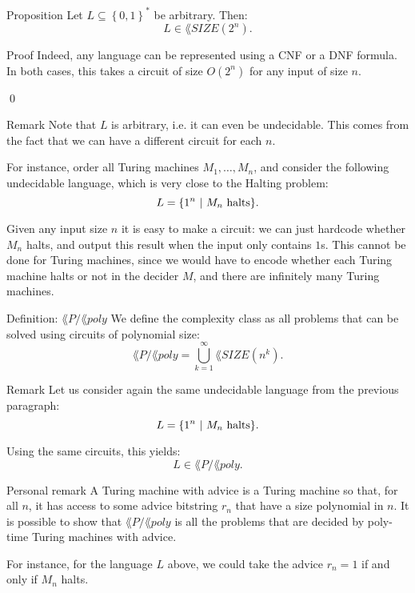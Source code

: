 \documentclass[a4paper]{article}
\begin{document}
\begin{parag}{Proposition}
    Let $L \subseteq \left\{0, 1\right\}^*$ be arbitrary. Then: 
    \[L \in \lang{SIZE}\left(2^n\right).\]

    \begin{subparag}{Proof}
        Indeed, any language can be represented using a CNF or a DNF formula. In both cases, this takes a circuit of size $O\left(2^n\right)$ for any input of size $n$.

        \qed
    \end{subparag}

    \begin{subparag}{Remark}
        Note that $L$ is arbitrary, i.e. it can even be undecidable. This comes from the fact that we can have a different circuit for each $n$.

        For instance, order all Turing machines $M_1, \ldots, M_n$, and consider the following undecidable language, which is very close to the Halting problem: 
        \[L = \left\{1^n \suchthat \text{$M_n$ halts}\right\}.\]

        Given any input size $n$ it is easy to make a circuit: we can just hardcode whether $M_n$ halts, and output this result when the input only contains $1$s. This cannot be done for Turing machines, since we would have to encode whether each Turing machine halts or not in the decider $M$, and there are infinitely many Turing machines.
    \end{subparag}
\end{parag}

\begin{parag}{Definition: $\lang{P}/\lang{poly}$}
    We define the  complexity class as all problems that can be solved using circuits of polynomial size: 
    \[\lang{P}/\lang{poly} = \bigcup_{k = 1}^{\infty} \lang{SIZE}\left(n^k\right).\]

    \begin{subparag}{Remark}
        Let us consider again the same undecidable language from the previous paragraph:
        \[L = \left\{1^n \suchthat \text{$M_n$ halts}\right\}.\]

        Using the same circuits, this yields:
        \[L \in \lang{P} / \lang{poly}.\]
    \end{subparag}

    \begin{subparag}{Personal remark}
        A Turing machine with advice is a Turing machine so that, for all $n$, it has access to some advice bitstring $r_n$ that have a size polynomial in $n$. It is possible to show that $\lang{P} / \lang{poly}$ is all the problems that are decided by poly-time Turing machines with advice. 

        For instance, for the language $L$ above, we could take the advice $r_n = 1$ if and only if $M_n$ halts.
    \end{subparag} 
\end{parag}
 
\end{document}
